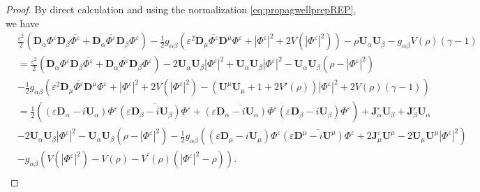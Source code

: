 \documentclass[a4paper, 15pt]{article}
\numberwithin{equation}{section}
\begin{document}
\begin{proof}
    By direct calculation and using the normalization \eqref{eq:propagwellprepREP}, we have 
\begin{align*}
	&\frac{\varepsilon^2}{2}(\textbf{D}_\alpha\Phi^\varepsilon\textbf{D}_\beta\overline{\Phi^\varepsilon}+\textbf{D}_\alpha\overline{\Phi^\varepsilon}\textbf{D}_\beta\Phi^\varepsilon)-\frac{1}{2}g_{\alpha\beta}(\varepsilon^2\textbf{D}_\mu\overline{\Phi^\varepsilon}\textbf{D}^\mu\Phi^\varepsilon+|\Phi^\varepsilon|^2+2V(|\Phi^\varepsilon|^2))-\rho \textbf{U}_\alpha \textbf{U}_\beta-g_{\alpha\beta}V(\rho)(\gamma-1)\\
&=\frac{\varepsilon^2}{2}(\textbf{D}_\alpha\Phi^\varepsilon\textbf{D}_\beta\overline{\Phi^\varepsilon}+\textbf{D}_\alpha\overline{\Phi^\varepsilon}\textbf{D}_\beta\Phi^\varepsilon)-2\textbf{U}_\alpha \textbf{U}_\beta |\Phi^\varepsilon|^2+\textbf{U}_\alpha \textbf{U}_\beta |\Phi^\varepsilon|^2-\textbf{U}_\alpha \textbf{U}_\beta (\rho-|\Phi^\varepsilon|^2)\\
&-\frac{1}{2}g_{\alpha\beta}(\varepsilon^2\textbf{D}_\mu\overline{\Phi^\varepsilon}\textbf{D}^\mu\Phi^\varepsilon+|\Phi^\varepsilon|^2+2V(|\Phi^\varepsilon|^2)-(\textbf{U}^\mu \textbf{U}_\mu+1+2V'(\rho))|\Phi^\varepsilon|^2+2V(\rho)(\gamma-1))\\
&=\frac{1}{2}((\varepsilon\textbf{D}_\alpha-i\textbf{U}_\alpha)\Phi^\varepsilon\overline{(\varepsilon\textbf{D}_\beta-i\textbf{U}_\beta)\Phi^\varepsilon}+\overline{(\varepsilon\textbf{D}_\alpha-i\textbf{U}_\alpha)\Phi^\varepsilon}(\varepsilon\textbf{D}_\beta-i\textbf{U}_\beta)\Phi^\varepsilon)+\textbf{J}^\varepsilon_\alpha \textbf{U}_\beta+\textbf{J}^\varepsilon_\beta \textbf{U}_\alpha\\
&-2\textbf{U}_\alpha \textbf{U}_\beta |\Phi^\varepsilon|^2-\textbf{U}_\alpha \textbf{U}_\beta (\rho-|\Phi^\varepsilon|^2)-\frac{1}{2}g_{\alpha\beta}((\varepsilon\textbf{D}_\mu-i\textbf{U}_\mu)\Phi^\varepsilon\overline{(\varepsilon\textbf{D}^\mu-i\textbf{U}^\mu )\Phi^\varepsilon}+2\textbf{J}^\varepsilon_\mu \textbf{U}^\mu -2\textbf{U}_\mu \textbf{U}^\mu |\Phi^\varepsilon|^2)\\
&-g_{\alpha\beta}(V(|\Phi^\varepsilon|^2)-V(\rho)-V^{\prime}(\rho)(|\Phi^\varepsilon|^2-\rho)).\\
\end{align*}
\end{proof}
\end{document}
